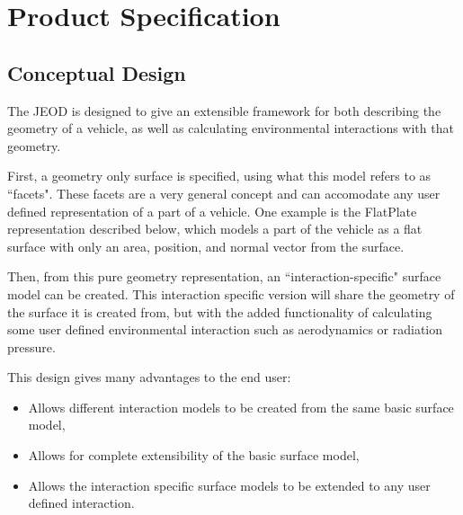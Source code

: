 %
%
%
%
%

\chapter{Product Specification}\label{ch:spec}

\section{Conceptual Design}

The JEOD \ModelDesc is designed to give an extensible framework
for both describing the geometry of a vehicle, as well as calculating
environmental interactions with that geometry.

First, a geometry only surface is specified, using
what this model refers to as ``facets". These facets are
a very general concept and can accomodate any user defined
representation of a part of a vehicle. One example is the FlatPlate
representation described below, which models a part of the vehicle as
a flat surface with only an area, position, and normal vector from the surface.

Then, from this pure geometry
representation, an ``interaction-specific" surface
model can be created. This interaction
specific version will share the geometry of the surface it is created from,
but with the added functionality of calculating some user defined
environmental interaction
such as aerodynamics or radiation pressure.

This design gives many advantages to the end user:

\begin{itemize}
\item{Allows different interaction models to be created from the same
basic surface model},
\item{Allows for complete extensibility of the basic surface model,}
\item{Allows the interaction specific surface models to be extended to
any user defined interaction.}
\end{itemize}

